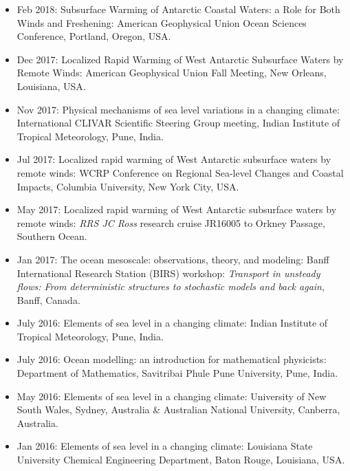 \begin{itemize}[leftmargin=*]
\item Feb 2018: {\sc Subsurface Warming of Antarctic Coastal Waters: a Role for Both Winds and Freshening}: {\sc American Geophysical Union Ocean Sciences Conference}, Portland, Oregon, USA.

\item Dec 2017: {\sc Localized Rapid Warming of West Antarctic Subsurface Waters by Remote Winds}: American Geophysical Union Fall Meeting, New Orleans, Louisiana, USA. 

\item Nov 2017: {\sc Physical mechanisms of sea level variations in a changing climate}: International CLIVAR Scientific Steering Group meeting, Indian Institute of Tropical Meteorology, Pune, India.


\item Jul 2017: {\sc Localized rapid warming of West Antarctic
    subsurface waters by remote winds}: WCRP Conference on Regional
  Sea-level Changes and Coastal Impacts, Columbia University, New York City, USA. 

\item May 2017: {\sc Localized rapid warming of West Antarctic
    subsurface waters by remote winds}: {\it RRS JC Ross} research cruise
  JR16005 to Orkney Passage, Southern Ocean.

\item Jan 2017: {\sc The ocean mesoscale: observations, theory, and
    modeling}: Banff International Research Station (BIRS) workshop:
  {\it Transport in unsteady flows: From deterministic structures to
    stochastic models and back again}, Banff, Canada.

\item July 2016: {\sc Elements of sea level in a changing climate}:
  Indian Institute of Tropical Meteorology, Pune, India.

\item July 2016: {\sc Ocean modelling: an introduction for
    mathematical physicists}: Department of Mathematics, Savitribai
  Phule Pune University, Pune, India.

\item May 2016: {\sc Elements of sea level in a changing climate}:
  University of New South Wales, Sydney, Australia \& Australian
  National University, Canberra, Australia.

\item Jan 2016: {\sc Elements of sea level in a changing climate}:
  Louisiana State University Chemical Engineering Department, Baton
  Rouge, Louisiana, USA.


\end{itemize}
